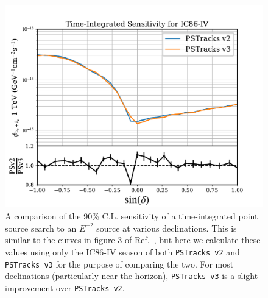 \documentclass[aps,10pt,prd,twocolumn,floats,letterpaper,showpacs,nofootinbib,bibnotes,notitlepage,superscriptaddress,floatfix]{revtex4-1}
\begin{document}
\begin{figure}[p]
\centering
\includegraphics[width=0.5\linewidth,viewport= 0 0 530 390, clip=false]{./TXSCheckPlots/v2v3_senscompare.pdf}
\caption[]{A comparison of the 90\% C.L. sensitivity of a time-integrated point source search to an $E^{-2}$ source at various declinations. This is similar to the curves in figure 3 of Ref.~\cite{Aartsen:2019fau}, but here we calculate these values using only the IC86-IV season of both {\tt PSTracks v2} and {\tt PSTracks v3} for the purpose of comparing the two. For most declinations (particularly near the horizon), {\tt PSTracks v3} is a slight improvement over {\tt PSTracks v2}.}\label{fig:v2v3senscompare}
\end{figure}
\end{document}
